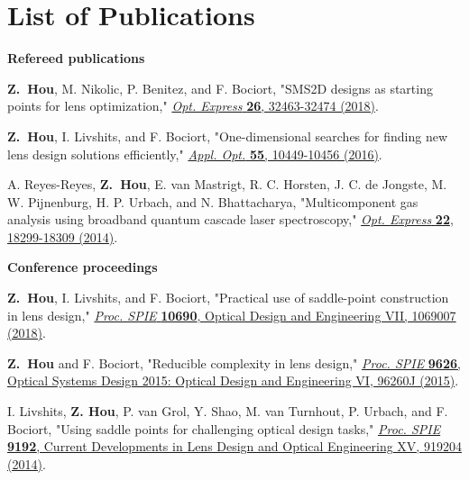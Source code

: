 \chapter*{List of Publications}
\label{publications}

\Large{\textbf{Refereed publications}}

\begin{enumerate}\small{
\item \textbf{Z.\ Hou},  M. Nikolic, P. Benitez, and F. Bociort, "SMS2D designs as starting points for lens optimization," \href{https://doi.org/10.1364/OE.26.032463}{\textit{Opt. Express} \textbf{26}, 32463-32474 (2018)}.
\item \textbf{Z.\ Hou}, I. Livshits, and F. Bociort, "One-dimensional searches for finding new lens design solutions efficiently," \href{https://doi.org/10.1364/AO.55.010449}{\textit{Appl. Opt.} \textbf{55}, 10449-10456 (2016)}. 
\item A. Reyes-Reyes, \textbf{Z.\ Hou}, E. van Mastrigt, R. C. Horsten, J. C. de Jongste, M. W. Pijnenburg, H. P. Urbach, and N. Bhattacharya, "Multicomponent gas analysis using broadband quantum cascade laser spectroscopy," \href{https://doi.org/10.1364/OE.22.018299}{\textit{Opt. Express} \textbf{22}, 18299-18309 (2014)}.
}\end{enumerate}

\vspace{3mm}
\noindent
\Large{\textbf{Conference proceedings}}
\begin{enumerate}\small{
\item \textbf{Z.\ Hou},  I. Livshits, and F. Bociort, "Practical use of saddle-point construction in lens design," \href{https://doi.org/10.1117/12.2312494}{\textit{Proc. SPIE} \textbf{10690}, Optical Design and Engineering VII, 1069007 (2018)}.
\item \textbf{Z.\ Hou} and F. Bociort, "Reducible complexity in lens design," \href{https://doi.org/10.1117/12.2191364}{\textit{Proc. SPIE} \textbf{9626}, Optical Systems Design 2015: Optical Design and Engineering VI, 96260J (2015)}.
\item I. Livshits, \textbf{Z. Hou}, P. van Grol, Y. Shao, M. van Turnhout, P. Urbach, and F. Bociort, "Using saddle points for challenging optical design tasks," \href{https://doi.org/10.1117/12.2061975}{\textit{Proc. SPIE} \textbf{9192}, Current Developments in Lens Design and Optical Engineering XV, 919204 (2014)}.

}\end{enumerate}

